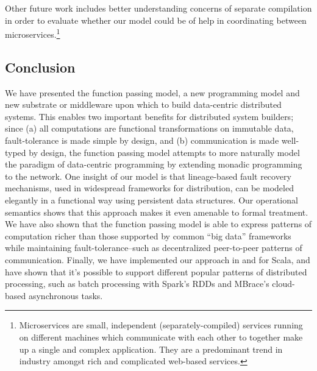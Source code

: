 \documentclass[10pt]{sigplanconf}
\theoremstyle{definition}
\theoremstyle{definition}
\begin{document}
Other future work includes better understanding concerns of separate compilation
in order to evaluate whether our model could be of help in coordinating between
microservices.\footnote{Microservices are small, independent
(separately-compiled) services running on different machines which communicate
with each other to together make up a single and complex application. They are a
predominant trend in industry amongst rich and complicated web-based services.}

\subsection{Conclusion}

We have presented the function passing model, a new programming model and new
substrate or middleware upon which to build data-centric distributed systems.
This enables two important benefits for distributed system builders; since (a)
all computations are functional transformations on immutable data,
fault-tolerance is made simple by design, and (b) communication is made
well-typed by design, the function passing model attempts to more naturally
model the paradigm of data-centric programming by extending monadic programming
to the network. One insight of our model is that lineage-based fault recovery
mechanisms, used in widespread frameworks for distribution, can be modeled
elegantly in a functional way using persistent data structures. Our operational
semantics shows that this approach makes it even amenable to formal treatment.
We have also shown that the function passing model is able to express patterns
of computation richer than those supported by common ``big data'' frameworks
while maintaining fault-tolerance--such as decentralized peer-to-peer patterns
of communication. Finally, we have implemented our approach in and for Scala,
and have shown that it's possible to support different popular patterns of
distributed processing, such as  batch processing with Spark's RDDs  and
MBrace's cloud-based asynchronous tasks.
\end{document}
